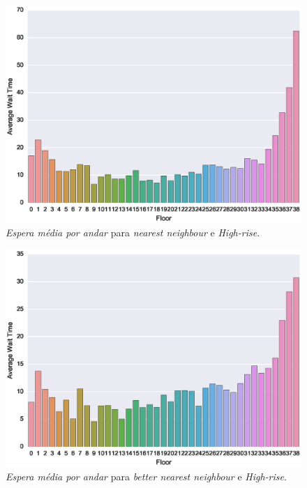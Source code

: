 \begin{figure}[H]
  \centering
  \includegraphics[scale=0.8]{img/results/High-rise/2_Simple_NearestNeighbour/averageWaitTime}
  \caption{\textit{Espera média por andar} para \textit{nearest neighbour} e \textit{High-rise}.}
  \label{fig:result:high-rise:avgwt:nn}
\end{figure}

\begin{figure}[H]
  \centering
  \includegraphics[scale=0.8]{img/results/High-rise/3_Simple_BetterNearestNeighbour/averageWaitTime}
  \caption{\textit{Espera média por andar} para \textit{better nearest neighbour} e \textit{High-rise}.}
  \label{fig:result:high-rise:avgwt:bnn}
\end{figure}

